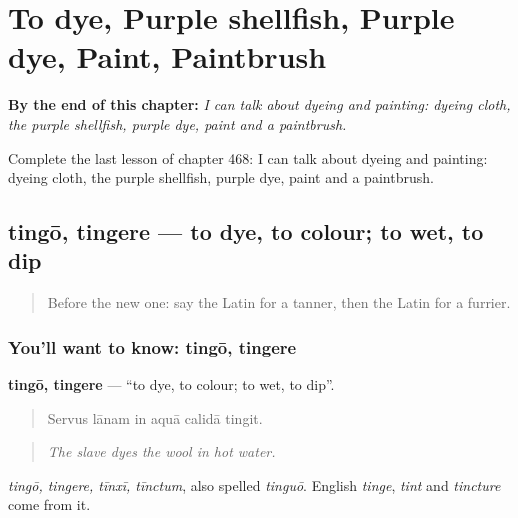 
\chapter{To dye, Purple shellfish, Purple dye, Paint, Paintbrush}
\label{ch:la-to-dye-purple-shellfish-purple-dye-paint-paintbrush}

\begin{chapteropening}
\textbf{By the end of this chapter:} \emph{I can talk about dyeing and painting: dyeing cloth, the purple shellfish, purple dye, paint and a paintbrush.}

Complete the last lesson of chapter 468: I can talk about dyeing and painting: dyeing cloth, the purple shellfish, purple dye, paint and a paintbrush.
\end{chapteropening}

\section[tingō, tingere]{tingō, tingere — to dye, to colour; to wet, to dip}

\label{lesson:LA-C468-tingo}



\begin{quote}
Before the new one: say the Latin for a tanner, then the Latin for a furrier.
\end{quote}

\subsection*{You'll want to know: tingō, tingere}
\textbf{tingō, tingere} — \textquotedblleft{}to dye, to colour; to wet, to dip\textquotedblright{}.

\begin{quote}
Servus lānam in aquā calidā tingit.
\end{quote}

\begin{quote}
\emph{The slave dyes the wool in hot water.}
\end{quote}

\emph{tingō, tingere, tīnxī, tīnctum}, also spelled \emph{tinguō}. English \emph{tinge}, \emph{tint} and \emph{tincture} come from it.

